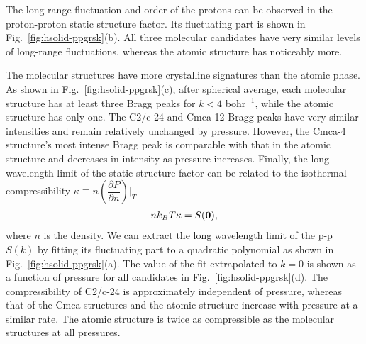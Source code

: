 The long-range fluctuation and order of the protons can be observed in the proton-proton static structure factor. Its fluctuating part is shown in Fig.~\ref{fig:hsolid-ppgrsk}(b).
All three molecular candidates have very similar levels of long-range fluctuations, whereas the atomic structure has noticeably more.

The molecular structures have more crystalline signatures than the atomic phase.
As shown in Fig.~\ref{fig:hsolid-ppgrsk}(c), after spherical average, each molecular structure has at least three Bragg peaks for $k<4$ bohr$^{-1}$, while the atomic structure has only one.
The C2/c-24 and Cmca-12 Bragg peaks have very similar intensities and remain relatively unchanged by pressure.
However, the Cmca-4 structure's most intense Bragg peak is comparable with that in the atomic structure and decreases in intensity as pressure increases.
Finally, the long wavelength limit of the static structure factor can be related to the isothermal compressibility $\kappa\equiv n(\dfrac{\partial P}{\partial n})\vert_T$
\begin{align}
nk_BT\kappa = S(\boldsymbol{0}),
\end{align}
where $n$ is the density. We can extract the long wavelength limit of the p-p $S(k)$ by fitting its fluctuating part to a quadratic polynomial as shown in Fig.~\ref{fig:hsolid-ppgrsk}(a).
The value of the fit extrapolated to $k=0$ is shown as a function of pressure for all candidates in Fig.~\ref{fig:hsolid-ppgrsk}(d).
The compressibility of C2/c-24 is approximately independent of pressure, whereas that of the Cmca structures and the atomic structure increase with pressure at a similar rate.
The atomic structure is twice as compressible as the molecular structures at all pressures.

